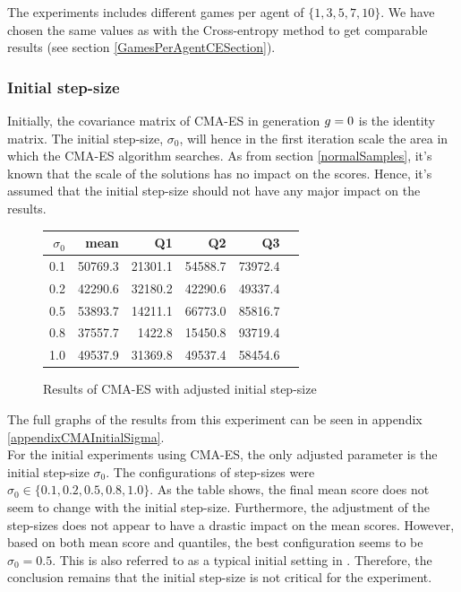 The experiments includes different games per agent of $\{1,3,5,7,10\}$. We have chosen the same 
values as with the Cross-entropy method to get comparable results (see section \ref{GamesPerAgentCESection}).

\subsubsection{Initial step-size \label{sec:CMAInitialStepSize}}
Initially, the covariance matrix of CMA-ES in generation $g = 0$
is the identity matrix. The initial step-size, $\sigma_0$, will hence in 
the first iteration scale the area in which the CMA-ES algorithm searches.
As from section \ref{normalSamples}, it's known that the scale of the 
solutions has no impact on the scores. Hence, it's assumed that the initial 
step-size should not have any major impact on the results.

\begin{figure}[H]
\centering
\begin{tabular}{r | r r r r r}
$\sigma_0$ & mean & Q1 & Q2 & Q3\\
\hline
0.1 & 50769.3 & 21301.1 & 54588.7 & 73972.4\\
0.2 & 42290.6 & 32180.2 & 42290.6 & 49337.4\\
0.5 & 53893.7 & 14211.1 & 66773.0 & 85816.7\\
0.8 & 37557.7 & 1422.8  & 15450.8 & 93719.4\\
1.0 & 49537.9 & 31369.8 & 49537.4 & 58454.6
\end{tabular}
\caption{Results of CMA-ES with adjusted initial step-size \label{CMAInitialSigmaConfigTest}}
\end{figure}
The full graphs of the results from this experiment can be seen in 
appendix \ref{appendixCMAInitialSigma}.\\
For the initial experiments using CMA-ES, 
the only adjusted parameter is the initial 
step-size $\sigma_0$. The configurations of step-sizes were 
$\sigma_0 \in \{0.1, 0.2, 0.5, 0.8, 1.0\}$. As the table shows,
the final mean score does not seem to change with the initial step-size.
Furthermore, the adjustment of the step-sizes does not appear to 
have a drastic impact on the mean scores. However, based on both mean score and
quantiles, the best configuration seems to be $\sigma_0 = 0.5$. This 
is also referred to as a typical initial setting in \citep{boumaza2009}.
Therefore, the conclusion remains that the initial step-size is not critical 
for the experiment.\\

